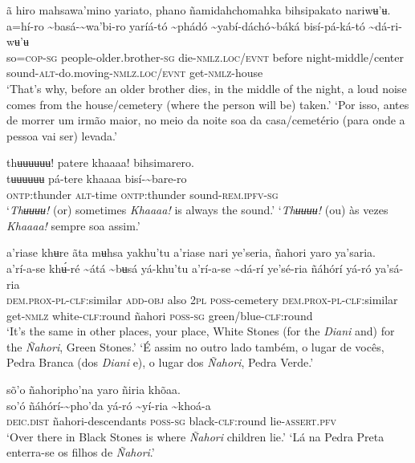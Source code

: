 \documentclass[output=paper,
modfonts,nonflat
]{langsci/langscibook}
\begin{document}
\ea ã hiro mahsawa'mino yariato, phano ñamidahchomahka bihsipakato nariwʉ'ʉ. \\[.3em]
\gll {\textasciitilde}a=hí-ro	{\textasciitilde}basá-{\textasciitilde}wa'bi-ro	yaríá-tó	{\textasciitilde}phádó	{\textasciitilde}yabí-dáchó{\textasciitilde}báká	bisí-pá-ká-tó	{\textasciitilde}dá-ri-wʉ'ʉ\\
     so=\textsc{cop-sg}	people-older.brother\textsc{-sg}	die-\textsc{nmlz.loc/evnt}	before	night-middle/center	sound-\textsc{alt}-do.moving-\textsc{nmlz.loc/evnt}	get\textsc{-nmlz}-house\\
\glt ‘That's why, before an older brother dies, in the middle of the night, a loud noise comes from the house/cemetery (where the person will be) taken.’
\glt ‘Por isso, antes de morrer um irmão maior, no meio da noite soa da casa/cemetério (para onde a pessoa vai ser) levada.’
\z 

\ea thʉʉʉʉʉʉ! patere khaaaa! bihsimarero. \\[.3em]
\gll tʉʉʉʉʉʉ	pá-tere	khaaaa	bisí-{\textasciitilde}bare-ro \\
     \textsc{ontp:}thunder	\textsc{alt}-time	\textsc{ontp:}thunder	sound-\textsc{rem.ipfv-sg}\\
\glt ‘\textit{Thʉʉʉʉ!} (or) sometimes \textit{Khaaaa!} is always the sound.’
\glt ‘\textit{Thʉʉʉʉ!} (ou) às vezes \textit{Khaaaa!} sempre soa assim.’
\z 

\ea a’riase khʉre ãta mʉhsa yakhu'tu a’riase nari ye'seria, ñahori yaro ya'saria. \\[.3em]
\gll a’rí-a-se	khʉ́-ré	{\textasciitilde}átá	{\textasciitilde}bʉsá	yá-khu'tu	a’rí-a-se {\textasciitilde}dá-rí	ye'sé-ria	ñáhórí	yá-ró	ya'sá-ria\\
     \textsc{dem.prox-pl-clf:}similar	\textsc{add-obj}	also	2\textsc{pl}	\textsc{poss}-cemetery	\textsc{dem.prox-pl-clf:}similar get\textsc{-nmlz}	white-\textsc{clf:}round	ñahori	\textsc{poss-sg}	green/blue-\textsc{clf:}round\\
\glt ‘It's the same in other places, your place, White Stones (for the \textit{Diani} and) for the \textit{Ñahori}, Green Stones.’
\glt ‘É assim no outro lado também, o lugar de vocês, Pedra Branca (dos \textit{Diani} e), o lugar dos \textit{Ñahori}, Pedra Verde.’
\z 

\ea sõ'o ñahoripho'na yaro ñiria khõaa.  \\[.3em]
\gll {\textasciitilde}so'ó	ñáhórí-{\textasciitilde}pho'da	yá-ró	{\textasciitilde}yí-ria	{\textasciitilde}khoá-a \\
     \textsc{deic.dist}	ñahori-descendants	\textsc{poss-sg}	black-\textsc{clf:}round	lie-\textsc{assert.pfv}\\
\glt ‘Over there in Black Stones is where \textit{Ñahori} children lie.’
\glt ‘Lá na Pedra Preta enterra-se os filhos de \textit{Ñahori}.’
\z 
\end{document}
